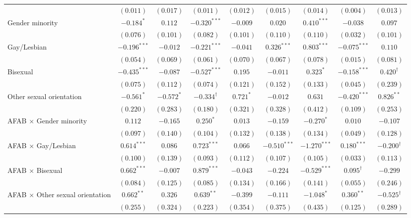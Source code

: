 \begin{table}[htpb]
{\begin{tabular}{l c c c c c c c c}
 & $(0.011)$ & $(0.017)$ & $(0.011)$ & $(0.012)$ & $(0.015)$ & $(0.014)$ & $(0.004)$ & $(0.013)$ \\
Gender minority & $-0.184^{*}$ & $0.112$ & $-0.320^{***}$ & $-0.009$ & $0.020$ & $0.410^{***}$ & $-0.038$ & $0.097$ \\
 & $(0.076)$ & $(0.101)$ & $(0.082)$ & $(0.101)$ & $(0.110)$ & $(0.110)$ & $(0.032)$ & $(0.101)$ \\
Gay/Lesbian & $-0.196^{***}$ & $-0.012$ & $-0.221^{***}$ & $-0.041$ & $0.326^{***}$ & $0.803^{***}$ & $-0.075^{***}$ & $0.110$ \\
 & $(0.054)$ & $(0.069)$ & $(0.061)$ & $(0.070)$ & $(0.067)$ & $(0.078)$ & $(0.015)$ & $(0.081)$ \\
Bisexual & $-0.435^{***}$ & $-0.087$ & $-0.527^{***}$ & $0.195$ & $-0.011$ & $0.323^{*}$ & $-0.158^{***}$ & $0.420^{\dagger}$ \\
 & $(0.075)$ & $(0.112)$ & $(0.074)$ & $(0.121)$ & $(0.152)$ & $(0.133)$ & $(0.045)$ & $(0.239)$ \\
Other sexual orientation & $-0.561^{*}$ & $-0.572^{*}$ & $-0.334^{\dagger}$ & $0.721^{*}$ & $-0.012$ & $0.631$ & $-0.420^{***}$ & $0.826^{**}$ \\
 & $(0.220)$ & $(0.283)$ & $(0.180)$ & $(0.321)$ & $(0.328)$ & $(0.412)$ & $(0.109)$ & $(0.253)$ \\
AFAB $\times$ Gender minority & $0.112$ & $-0.165$ & $0.250^{*}$ & $0.013$ & $-0.159$ & $-0.270^{*}$ & $0.010$ & $-0.107$ \\
 & $(0.097)$ & $(0.140)$ & $(0.104)$ & $(0.132)$ & $(0.138)$ & $(0.134)$ & $(0.049)$ & $(0.128)$ \\
AFAB $\times$ Gay/Lesbian & $0.614^{***}$ & $0.086$ & $0.723^{***}$ & $0.066$ & $-0.510^{***}$ & $-1.270^{***}$ & $0.180^{***}$ & $-0.200^{\dagger}$ \\
 & $(0.100)$ & $(0.139)$ & $(0.093)$ & $(0.112)$ & $(0.107)$ & $(0.105)$ & $(0.033)$ & $(0.113)$ \\
AFAB $\times$ Bisexual & $0.662^{***}$ & $-0.007$ & $0.879^{***}$ & $-0.043$ & $-0.224$ & $-0.529^{***}$ & $0.095^{\dagger}$ & $-0.299$ \\
 & $(0.084)$ & $(0.125)$ & $(0.085)$ & $(0.134)$ & $(0.166)$ & $(0.141)$ & $(0.055)$ & $(0.246)$ \\
AFAB $\times$ Other sexual orientation & $0.662^{**}$ & $0.326$ & $0.639^{**}$ & $-0.399$ & $-0.111$ & $-1.048^{*}$ & $0.360^{**}$ & $-0.525^{\dagger}$ \\
 & $(0.255)$ & $(0.324)$ & $(0.223)$ & $(0.354)$ & $(0.375)$ & $(0.435)$ & $(0.125)$ & $(0.289)$ \\

\end{tabular}}
\end{table}
